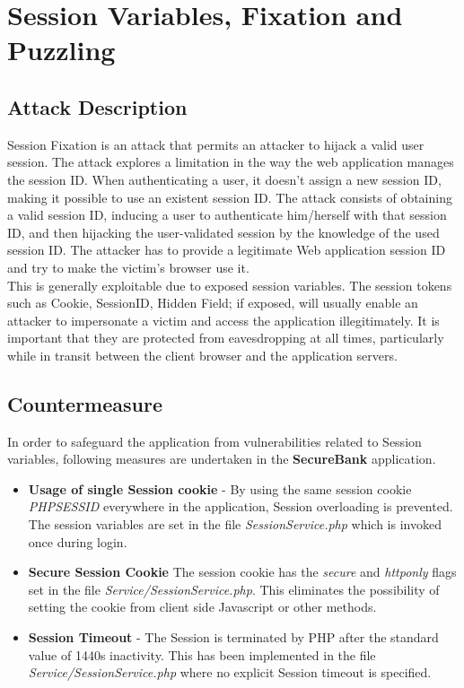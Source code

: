 \section{Session Variables, Fixation and Puzzling}

\subsection{Attack Description}
Session Fixation is an attack that permits an attacker to hijack a valid user session. The attack explores a limitation in the way the web application manages the session ID. When authenticating a user, it doesn’t assign a new session ID, making it possible to use an existent session ID. The attack consists of obtaining a valid session ID, inducing a user to authenticate him/herself with that session ID, and then hijacking the user-validated session by the knowledge of the used session ID. The attacker has to provide a legitimate Web application session ID and try to make the victim's browser use it. \\

This is generally exploitable due to exposed session variables. The session tokens such as Cookie, SessionID, Hidden Field; if exposed, will usually enable an attacker to impersonate a victim and access the application illegitimately. It is important that they are protected from eavesdropping at all times, particularly while in transit between the client browser and the application servers. 

\subsection{Countermeasure}
In order to safeguard the application from vulnerabilities related to Session variables, following measures are undertaken in the \textbf{SecureBank} application.
\begin{itemize}
\item \textbf{Usage of single Session cookie} - By using the same session cookie \textit{PHPSESSID} everywhere in the application, Session overloading is prevented. The session variables are set in the file \textit{SessionService.php} which is invoked once during login.
\item \textbf{Secure Session Cookie}
The session cookie has the \textit{secure} and \textit{httponly} flags set in the file \textit{Service/SessionService.php}. This eliminates the possibility of setting the cookie from client side Javascript or other methods.
\item \textbf{Session Timeout} - The Session is terminated by PHP after the standard value of 1440s
inactivity. This has been implemented in the file \textit{Service/SessionService.php} where no explicit Session timeout is specified.
\end{itemize}

\clearpage